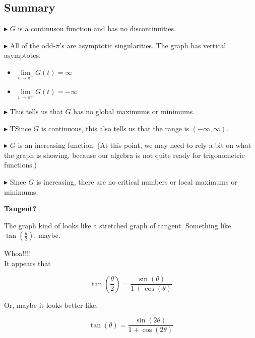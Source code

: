 \documentclass{ximera}
\begin{document}
\subsection{Summary}

$\blacktriangleright$ $G$ is a continusou function and has no discontinuities.  

$\blacktriangleright$ All of the odd-$\pi$'s are asymptotic singularities.  The graph has vertical asymptotes.


\begin{itemize}
\item $\lim\limits_{t \to \pi^{-}}G(t) = \infty$ 

\item $\lim\limits_{t \to \pi^{+}}G(t) = -\infty$ 
\end{itemize}


$\blacktriangleright$ This tells us that $G$ has no global maximums or minimums.  

$\blacktriangleright$ TSince $G$ is continuous, this also tells us that the range is $(-\infty, \infty)$.  




$\blacktriangleright$ $G$ is an increasing function. (At this point, we may need to rely a bit on what the graph is showing, because our algebra is not quite ready for trigonometric functions.)

$\blacktriangleright$ Since $G$ is increasing, there are no critical numbers or local maximums or minimums.









\begin{observation}   \textbf{Tangent?}


The graph kind of looks like a stretched graph of tangent.  Something like $\tan\left( \frac{\theta}{2} \right)$, maybe.






\begin{center}
\end{center}


Whoa!!!! \\


It appears that


\[   \tan\left( \frac{\theta}{2} \right)   = \frac{\sin(\theta)}{1 + \cos(\theta)}   \]




Or, maybe it looks better like, 




\[   \tan(\theta)   = \frac{\sin(2\theta)}{1 + \cos(2\theta)}   \]







\end{observation}
\end{document}
